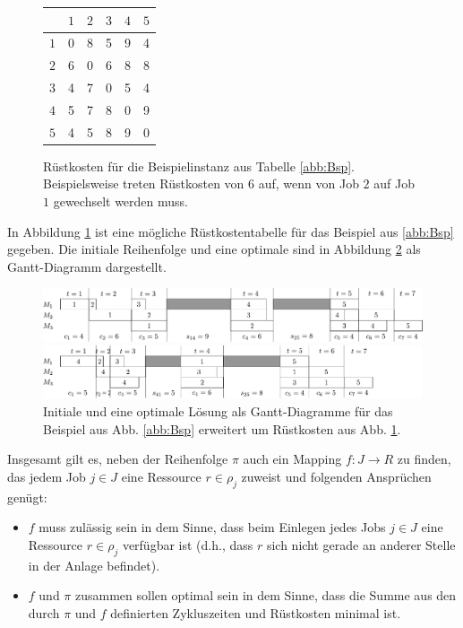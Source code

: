 \documentclass{scrreprt}
\begin{document}
\begin{figure}
    \begin{center}
        \begin{tabular}{c|ccccc}
            & $1$ & $2$ & $3$ & $4$ & $5$ \\ \hline
            $1$ & 0 & 8 & 5 & 9 & 4\\
            $2$ & 6 & 0 & 6 & 8 & 8\\
            $3$ & 4 & 7 & 0 & 5 & 4\\
            $4$ & 5 & 7 & 8 & 0 & 9\\
            $5$ & 4 & 5 & 8 & 9 & 0
        \end{tabular}
    \end{center}
    \caption{
        \label{abb:BspRes}
        Rüstkosten für die Beispielinstanz aus Tabelle \ref{abb:Bsp}.
        Beispielsweise treten Rüstkosten von $6$ auf, wenn von Job $2$ auf Job $1$ gewechselt werden muss.
    }
\end{figure}
In Abbildung \ref{abb:BspRes} ist eine mögliche Rüstkostentabelle für das Beispiel aus \ref{abb:Bsp} gegeben.
Die initiale Reihenfolge und eine optimale sind in Abbildung \ref{abb:ganttres} als Gantt-Diagramm dargestellt.
\begin{figure}
    \begin{center}
        \includegraphics[width=\textwidth]{graphics/bspresinit.pdf}
    \end{center}
    \begin{center}
        \includegraphics[width=\textwidth]{graphics/bspresopt.pdf}
    \end{center}
    \caption{
        \label{abb:ganttres}
        Initiale und eine optimale Lösung als Gantt-Diagramme für das Beispiel aus Abb. \ref{abb:Bsp} erweitert um Rüstkosten aus Abb. \ref{abb:BspRes}.
    }
\end{figure}

Insgesamt gilt es, neben der Reihenfolge $\pi$ auch ein Mapping $f:J\rightarrow R$ zu finden, 
das jedem Job $j\in J$ eine Ressource $r\in\rho_j$ zuweist und folgenden Ansprüchen genügt:
\begin{itemize}
    \item $f$ muss zulässig sein in dem Sinne, dass beim Einlegen jedes Jobs $j\in J$ eine Ressource $r\in\rho_j$ verfügbar ist
        (d.h., dass $r$ sich nicht gerade an anderer Stelle in der Anlage befindet).
    \item $f$ und $\pi$ zusammen sollen optimal sein in dem Sinne, dass die Summe aus den durch $\pi$ und $f$ definierten Zykluszeiten und 
        Rüstkosten minimal ist.
\end{itemize}
\end{document}
